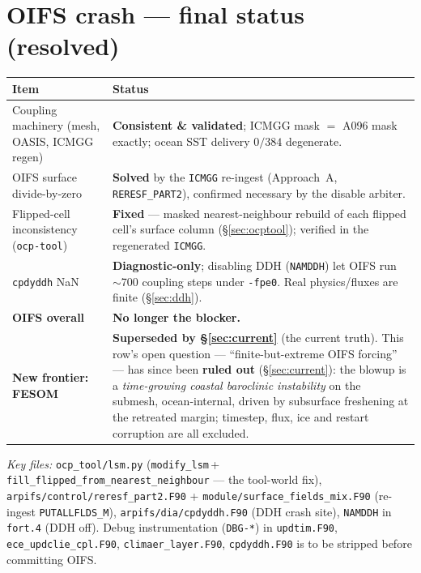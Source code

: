 \documentclass[11pt,a4paper]{article}
\newcommand{\code}[1]{\texttt{\small #1}}
\newcommand{\file}[1]{\texttt{\footnotesize #1}}
\begin{document}
\section{OIFS crash --- final status (resolved)}\label{sec:state}
\begin{tabular}{@{}p{}p{}@{}}
\toprule
\textbf{Item} & \textbf{Status}\\
\midrule
Coupling machinery (mesh, OASIS, ICMGG regen) & \textbf{Consistent \& validated};
  ICMGG mask $=$ A096 mask exactly; ocean SST delivery $0/384$ degenerate.\\
OIFS surface divide-by-zero & \textbf{Solved} by the \code{ICMGG} re-ingest
  (Approach~A, \code{RERESF\_PART2}), confirmed necessary by the disable arbiter.\\
Flipped-cell inconsistency (\code{ocp-tool}) & \textbf{Fixed} --- masked nearest-neighbour
  rebuild of each flipped cell's surface column (\S\ref{sec:ocptool}); verified in the
  regenerated \code{ICMGG}.\\
\code{cpdyddh} NaN & \textbf{Diagnostic-only}; disabling DDH (\code{NAMDDH}) let OIFS run
  $\sim$700 coupling steps under \code{-fpe0}. Real physics/fluxes are finite
  (\S\ref{sec:ddh}).\\
\textbf{OIFS overall} & \textbf{No longer the blocker.}\\
\midrule
\textbf{New frontier: FESOM} & \textbf{Superseded by \S\ref{sec:current}} (the current
  truth). This row's open question --- ``finite-but-extreme OIFS forcing'' --- has since
  been \textbf{ruled out} (\S\ref{sec:current}): the blowup is a \emph{time-growing coastal
  baroclinic instability} on the submesh, ocean-internal, driven by subsurface freshening
  at the retreated margin; timestep, flux, ice and restart corruption are all excluded.\\
\bottomrule
\end{tabular}

\vspace{1em}
\noindent\emph{Key files:}
\file{ocp\_tool/lsm.py} (\code{modify\_lsm}\,+\,\code{fill\_flipped\_from\_nearest\_neighbour}
--- the tool-world fix),
\file{arpifs/control/reresf\_part2.F90} + \file{module/surface\_fields\_mix.F90}
(re-ingest \code{PUTALLFLDS\_M}),
\file{arpifs/dia/cpdyddh.F90} (DDH crash site),
\code{NAMDDH} in \file{fort.4} (DDH off).
Debug instrumentation (\code{DBG-*}) in \file{updtim.F90},
\file{ece\_updclie\_cpl.F90}, \file{climaer\_layer.F90}, \file{cpdyddh.F90} is to be
stripped before committing OIFS.
\end{document}
